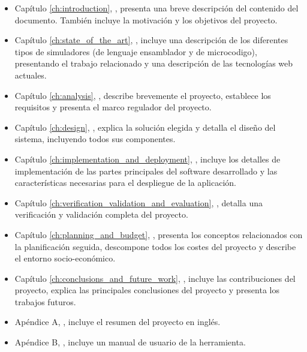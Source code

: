 \begin{itemize}

\item Capítulo \ref{ch:introduction}, \textit{}, presenta una breve descripción del contenido del documento. También incluye la motivación y los objetivos del proyecto.

\item Capítulo \ref{ch:state_of_the_art}, \textit{}, incluye una descripción de los diferentes tipos de simuladores (de lenguaje \gls{ensamblador} y de \gls{microcodigo}), presentando el trabajo relacionado y una descripción de las tecnologías web actuales.

\item Capítulo \ref{ch:analysis}, \textit{}, describe brevemente el proyecto, establece los requisitos y presenta el marco regulador del proyecto.

\item Capítulo \ref{ch:design}, \textit{}, explica la solución elegida y detalla el diseño del sistema, incluyendo todos sus componentes.

\item Capítulo \ref{ch:implementation_and_deployment}, \textit{}, incluye los detalles de implementación de las partes principales del \gls{software} desarrollado y las características necesarias para el despliegue de la aplicación.

\item Capítulo \ref{ch:verification_validation_and_evaluation}, \textit{}, detalla una verificación y validación completa del proyecto.

\item Capítulo \ref{ch:planning_and_budget}, \textit{}, presenta los conceptos relacionados con la planificación seguida, descompone todos los costes del proyecto y describe el entorno socio-económico.

\item Capítulo \ref{ch:conclusions_and_future_work}, \textit{}, incluye las contribuciones del proyecto, explica las principales conclusiones del proyecto y presenta los trabajos futuros.

\item Apéndice A, \textit{}, incluye el resumen del proyecto en inglés.

\item Apéndice B, \textit{}, incluye un manual de usuario de la herramienta.

\end{itemize}

